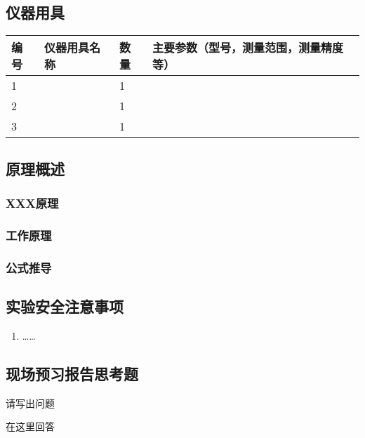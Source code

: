 \documentclass[dvipsnames, svgnames,a4paper,11pt]{article}
\begin{document}
\subsection{仪器用具}
\begin{table}[htbp]
	\centering
	\renewcommand\arraystretch{1.6}
	\begin{tabular}{p{}|p{}|p{}|p{}}
	\hline
	编号& 仪器用具名称 & 数量 &  主要参数（型号，测量范围，测量精度等） \\
	\hline
	1& &1 & \\
	2& &1 & \\
	3& &1 &  \\
	

	\hline
\end{tabular}
\end{table}

\subsection{原理概述}
		\subsubsection{XXX原理}


		\subsubsection{工作原理}
			
		\subsubsection{公式推导}

		

\subsection{实验安全注意事项}
\begin{enumerate}
	\item ……
\end{enumerate}

\clearpage
\subsection{现场预习报告思考题}
	\begin{question}
		请写出问题
	\end{question}
	在这里回答
\end{document}
